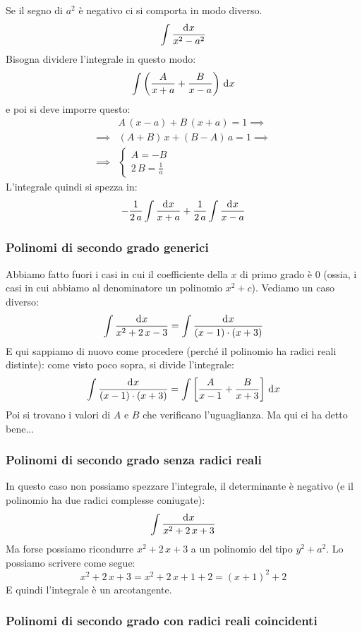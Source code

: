 Se il segno di $a^2$ \`e negativo ci si comporta in modo diverso.
\[
\int \frac{\diff x}{x^2 - a^2}
\]
Bisogna dividere l'integrale in questo modo:
\[
\int \left( \frac{A}{x + a} + \frac{B}{x - a} \right) \dx
\]
e poi si deve imporre questo:
\begin{align*}
& A \, (x - a) + B \, (x + a) = 1 \implies \\
\implies & (A + B) \, x + (B - A) \, a = 1 \implies \\
\implies & \begin{cases}
A = - B \\
2 \, B = \frac{1}{a}
\end{cases}
\end{align*}
L'integrale quindi si spezza in:
\[
- \frac{1}{2 \,a} \int \frac{\diff x}{x + a}
+ \frac{1}{2 \,a} \int \frac{\diff x}{x - a}
\]

\subsubsection{Polinomi di secondo grado generici}

Abbiamo fatto fuori i casi in cui il coefficiente della $x$ di primo grado \`e 0 (ossia, i casi in cui abbiamo al denominatore un polinomio $x^2 + c$). Vediamo un caso diverso:
\[
\int \frac{\diff x}{x^2 + 2 \, x - 3} =
\int \frac{\diff x}{(x - 1) \cdot (x + 3)}
\]
E qui sappiamo di nuovo come procedere (perch\'e il polinomio ha radici reali distinte): come visto poco sopra, si divide l'integrale:
\[
\int \frac{\diff x}{(x - 1) \cdot (x + 3)} =
\int \left[ \frac{A}{x - 1} + \frac{B}{x + 3} \right] \dx
\]
Poi si trovano i valori di $A$ e $B$ che verificano l'uguaglianza. Ma qui ci ha detto bene...

\subsubsection{Polinomi di secondo grado senza radici reali}

In questo caso non possiamo spezzare l'integrale, il determinante \`e negativo (e il polinomio ha due radici complesse coniugate):
\[
\int \frac{\diff x}{x^2 + 2 \, x + 3}
\]
Ma forse possiamo ricondurre $x^2 + 2 \, x + 3$ a un polinomio del tipo $y^2 + a^2$. Lo possiamo scrivere come segue:
\[
x^2 + 2 \, x + 3 = x^2 + 2 \, x + 1 + 2 =
{(x + 1)}^2 + 2
\]
E quindi l'integrale \`e un arcotangente.

\subsubsection{Polinomi di secondo grado con radici reali coincidenti}

